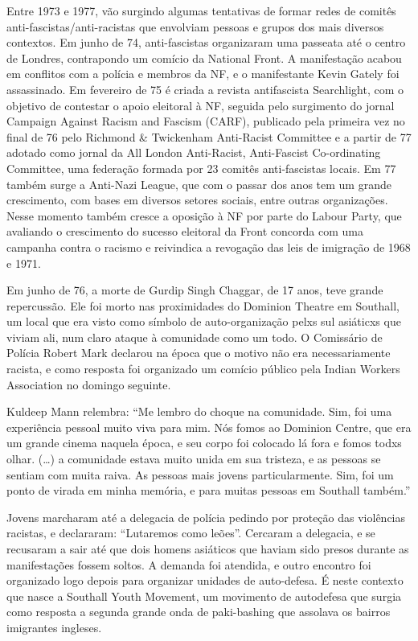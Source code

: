 Entre 1973 e 1977, vão surgindo algumas tentativas de formar redes de comitês anti-fascistas/anti-racistas que envolviam pessoas e grupos dos mais diversos contextos. Em junho de 74, anti-fascistas organizaram uma passeata até o centro de Londres, contrapondo um comício da National Front. A manifestação acabou em conflitos com a polícia e membros da NF, e o manifestante Kevin Gately foi assassinado. Em fevereiro de 75 é criada a revista antifascista Searchlight, com o objetivo de contestar o apoio eleitoral à NF, seguida pelo surgimento do jornal Campaign Against Racism and Fascism (CARF), publicado pela primeira vez no final de 76 pelo Richmond \& Twickenham Anti-Racist Committee e a partir de 77 adotado como jornal da All London Anti-Racist, Anti-Fascist Co-ordinating Committee, uma federação formada por 23 comitês anti-fascistas locais. Em 77 também surge a Anti-Nazi League, que com o passar dos anos tem um grande crescimento, com bases em diversos setores sociais, entre outras organizações. Nesse momento também cresce a oposição à NF por parte do Labour Party, que avaliando o crescimento do sucesso eleitoral da Front concorda com uma campanha contra o racismo e reivindica a revogação das leis de imigração de 1968 e 1971.

Em junho de 76, a morte de Gurdip Singh Chaggar, de 17 anos, teve grande repercussão. Ele foi morto nas proximidades do Dominion Theatre em Southall, um local que era visto como símbolo de auto-organização pelxs sul asiáticxs que viviam ali, num claro ataque à comunidade como um todo. O Comissário de Polícia Robert Mark declarou na época que o motivo não era necessariamente racista, e como resposta foi organizado um comício público pela Indian Workers Association no domingo seguinte.

Kuldeep Mann relembra: “Me lembro do choque na comunidade. Sim, foi uma experiência pessoal muito viva para mim. Nós fomos ao Dominion Centre, que era um grande cinema naquela época, e seu corpo foi colocado lá fora e fomos todxs olhar. (…) a comunidade estava muito unida em sua tristeza, e as pessoas se sentiam com muita raiva. As pessoas mais jovens particularmente. Sim, foi um ponto de virada em minha memória, e para muitas pessoas em Southall também.”

Jovens marcharam até a delegacia de polícia pedindo por proteção das violências racistas, e declararam: “Lutaremos como leões”. Cercaram a delegacia, e se recusaram a sair até que dois homens asiáticos que haviam sido presos durante as manifestações fossem soltos. A demanda foi atendida, e outro encontro foi organizado logo depois para organizar unidades de auto-defesa. É neste contexto que nasce a Southall Youth Movement, um movimento de autodefesa que surgia como resposta a segunda grande onda de paki-bashing que assolava os bairros imigrantes ingleses.

